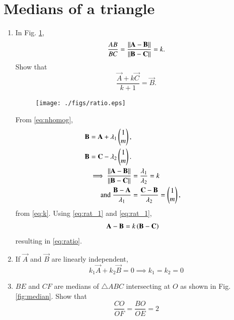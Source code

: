 \documentclass[journal,12pt,twocolumn]{IEEEtran}
\renewcommand\thesection{\arabic{section}}
\begin{document}
\section{Medians of a triangle}
\begin{enumerate}[label=\thesection.\arabic*
,ref=\thesection.\theenumi]
\item In Fig. \ref{fig:ratio},
\begin{equation}
\frac{AB}{BC} = \frac{\lVert\mathbf{A}-\mathbf{B}\rVert}{\lVert\mathbf{B}-\mathbf{C}\rVert} = k.
\label{eq:k}
\end{equation}
%
Show that
%
\begin{equation}
\frac{\vec{A}+k\vec{C}}{k+1} = \vec{B}.
\label{eq:ratio}
\end{equation}
%
\begin{figure}[!hb]
\centering
\texttt{[image: ./figs/ratio.eps]}
\caption{}
\label{fig:ratio}
\end{figure}
\solution From \eqref{eq:nhomog}, 
\begin{align}
\begin{split}
\mathbf{B} &= \mathbf{A} + \lambda_1 \begin{pmatrix}1 \\ m\end{pmatrix},
\\
\mathbf{B} &= \mathbf{C} - \lambda_2 \begin{pmatrix}1 \\ m\end{pmatrix}.
\end{split}
\\
\label{eq:rat_1}
\implies \frac{\lVert\mathbf{A}-\mathbf{B}\rVert}{\lVert\mathbf{B}-\mathbf{C}\rVert} &= 
\frac{\lambda_1}{\lambda_2} = k
\\
\text{and } \frac{\mathbf{B}- \mathbf{A}}{\lambda_1} &= \frac{\mathbf{C}- 
\mathbf{B}}{\lambda_2} =  \begin{pmatrix}1 \\ m\end{pmatrix},
\label{eq:rat_2}
\end{align}
%
from \eqref{eq:k}. Using \eqref{eq:rat_1} and \eqref{eq:rat_1},
\begin{align}
\mathbf{A}- \mathbf{B} &=  k\left(\mathbf{B}- \mathbf{C}\right)
\end{align}
%
resulting in \eqref{eq:ratio}.
%
\item If $\vec{A}$ and $\vec{B}$ are linearly independent,  
\begin{equation}
k_1\vec{A} + k_2\vec{B} = 0 \implies k_1=k_2=0
\end{equation}
\item $BE$ and $CF$ are medians of $\triangle ABC$ intersecting at $O$ as shown in Fig. \ref{fig:median}. 
Show that
\begin{equation}
\frac{CO}{OF} = \frac{BO}{OE} = 2
\end{equation}
%
\begin{figure}[!hb]

\end{figure}
\end{enumerate}
\end{document}
